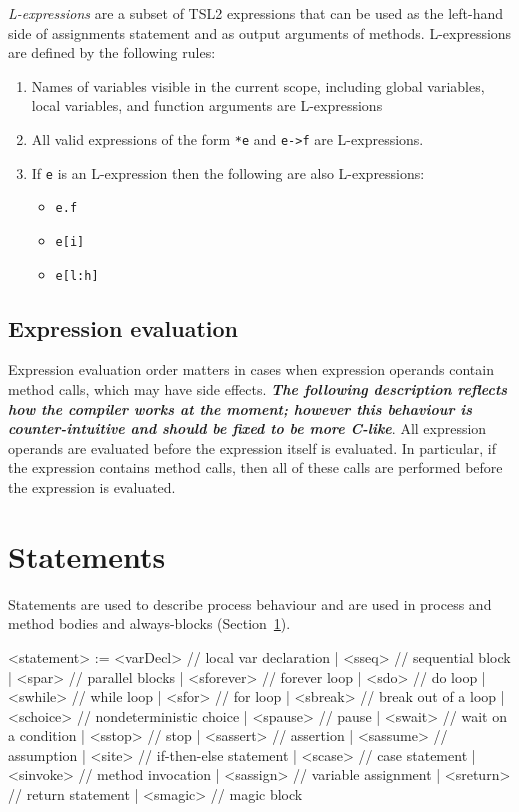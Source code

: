 \documentclass{report}
\newcommand{\src}[1]{\texttt{#1}}
\newcommand{\tsl}{TSL2 }
\newcommand{\comment}[1]{{\textit{\textbf{#1}}}}
\begin{document}
\emph{L-expressions} are a subset of \tsl expressions that can be 
used as the left-hand side of assignments statement and as output 
arguments of methods.  L-expressions are defined by the following 
rules:
\begin{enumerate}
    \item Names of variables visible in the current scope, 
        including global variables, local variables, and function 
        arguments are L-expressions
    \item All valid expressions of the form \src{*e} and 
        \src{e->f} are L-expressions.
    \item If \src{e} is an L-expression then the following are 
        also L-expressions:
        \begin{itemize}
            \item \src{e.f}
            \item \src{e[i]}
            \item \src{e[l:h]}
        \end{itemize}
\end{enumerate}

\subsection{Expression evaluation}

Expression evaluation order matters in cases when expression 
operands contain method calls, which may have side effects.  
\comment{The following description reflects how the compiler works 
at the moment; however this behaviour is counter-intuitive and 
should be fixed to be more C-like}.  All expression operands are 
evaluated before the expression itself is evaluated.  In 
particular, if the expression contains method calls, then all of 
these calls are performed before the expression is evaluated.

\section{Statements}

Statements are used to describe process behaviour and are used in 
process and method bodies and always-blocks (Section~\ref{}).

\begin{bnflisting}{}
<statement> := <varDecl>  // local var declaration
             | <sseq>     // sequential block
             | <spar>     // parallel blocks
             | <sforever> // forever loop
             | <sdo>      // do loop
             | <swhile>   // while loop
             | <sfor>     // for loop
             | <sbreak>   // break out of a loop
             | <schoice>  // nondeterministic choice
             | <spause>   // pause
             | <swait>    // wait on a condition
             | <sstop>    // stop
             | <sassert>  // assertion
             | <sassume>  // assumption
             | <site>     // if-then-else statement
             | <scase>    // case statement
             | <sinvoke>  // method invocation
             | <sassign>  // variable assignment
             | <sreturn>  // return statement
             | <smagic>   // magic block
\end{bnflisting}
\end{document}
